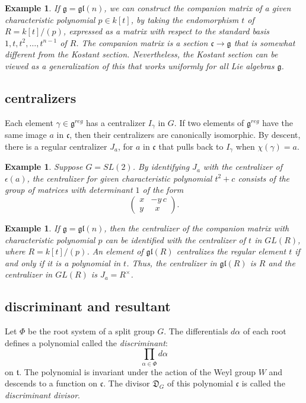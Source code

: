 \documentclass[brochure,english,12pt]{bourbaki}
\newtheorem{example}[equation]{Example}
\def\gl{\mathfrak{gl}}
\def\g{\mathfrak{g}}
\def\t{\mathfrak{t}}
\def\cc{\mathfrak{c}}
\def\DIV{{\mathfrak{D}}}
\begin{document}
\begin{example}
  If $\g=\gl(n)$, we can construct the companion matrix of a given
  characteristic polynomial $p\in k[t]$, by taking the endomorphism $t$ of
  $R=k[t]/(p)$, expressed as a matrix with respect to the standard
  basis $1,t,t^2,\ldots,t^{n-1}$ of $R$.  The companion matrix is a
  section $\cc\to\g$ that is somewhat different from the Kostant
  section.  Nevertheless, the Kostant section can be viewed as a
  generalization of this that works uniformly for all Lie algebras
  $\g$.
\end{example}


\subsection{centralizers}

Each element $\gamma\in\g^{reg}$ has a centralizer $I_\gamma$ in $G$.  If two
elements of $\g^{reg}$ have the same image $a$ in $\cc$, then their
centralizers are canonically isomorphic.  By descent, there is a
regular centralizer $J_a$, for $a$ in $\cc$ that pulls back to $I_\gamma$ when $\chi(\gamma)=a$.



\begin{example}  Suppose $G=SL(2)$.  By identifying $J_a$ with the centralizer of
  $\epsilon(a)$, the centralizer for given characteristic polynomial $t^2+c$ consists of
  the group of matrices with determinant $1$ of the form
\[
\begin{pmatrix} x & -y\, c\\ y & \phantom{y}x
\end{pmatrix}.
\]
\end{example}

\begin{example}
  If $\g=\gl(n)$, then the centralizer of the companion matrix with
  characteristic polynomial $p$ can be identified with the centralizer
  of $t$ in $GL(R)$, where $R=k[t]/(p)$.  An
  element of $\gl(R)$ centralizes the regular element $t$ if and only if it is a polynomial
  in $t$.  Thus, the centralizer in $\gl(R)$ is $R$ and the centralizer in $GL(R)$
 is $J_a = R^\times$.
\end{example}


\subsection{discriminant and resultant}

Let $\Phi$ be the root system of a split group $G$.  The differentials $d\alpha$ of each
root defines a  polynomial called the {\it discriminant}:
\begin{equation}\label{eqn:disc}
\prod_{\alpha\in\Phi} d\alpha
\end{equation}
on $\t$.  The polynomial is invariant under the action of the Weyl group 
$W$ and descends to a function on $\cc$.
The divisor $\DIV_G$ of this polynomial $\cc$ is called the {\it discriminant divisor}.
\end{document}
